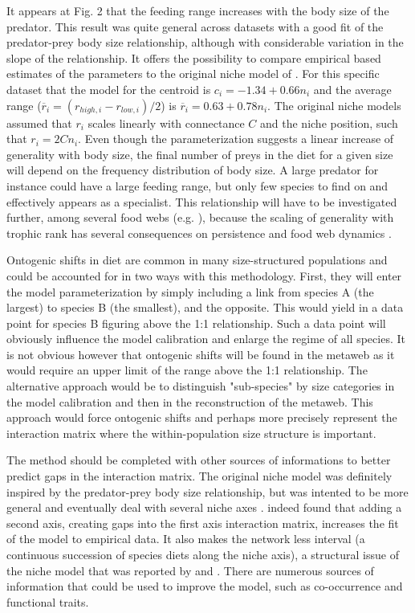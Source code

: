 \documentclass[12pt]{article}
\begin{document}
It appears at Fig. 2 that the feeding range increases with the body size of the
predator. This result was quite general across datasets with a good fit of the
predator-prey body size relationship, although with considerable variation in
the slope of the relationship. It offers the possibility to compare empirical
based estimates of the parameters to the original niche model of
\textcite{Williams2000}. For this specific dataset that the model for the
centroid is $c_i = -1.34 + 0.66n_i$ and the average range
($\overline{r}_i=(r_{high,i} - r_{low,i})/2$) is $\overline{r}_i = 0.63 +
0.78n_i$. The original niche models assumed that $r_i$ scales linearly with
connectance $C$ and the niche position, such that $r_i = 2Cn_i$. Even though the
parameterization suggests a linear increase of generality with body size, the
final number of preys in the diet for a given size will depend on the frequency
distribution of body size. A large predator for instance could have a large
feeding range, but only few species to find on and effectively appears as a
specialist. This relationship will have to be investigated further, among
several food webs (e.g. \textcite{Digel2011}), because the scaling of generality
with trophic rank has several consequences on persistence
\parencite{Gravel2011b} and food web dynamics \parencite{Brose2006,Berlow2009}.

Ontogenic shifts in diet are common in many size-structured populations and
could be accounted for in two ways with this methodology. First, they will enter
the model parameterization by simply including a link from species A (the
largest) to species B (the smallest), and the opposite. This would yield in a
data point for species B figuring above the 1:1 relationship. Such a data point
will obviously influence the model calibration and enlarge the regime of all
species. It is not obvious however that ontogenic shifts will be found in the
metaweb as it would require an upper limit of the range above the 1:1
relationship. The alternative approach would be to distinguish "sub-species" by
size categories in the model calibration and then in the reconstruction of the
metaweb. This approach would force ontogenic shifts and perhaps more precisely
represent the interaction matrix where the within-population size structure is
important.

The method should be completed with other sources of informations to better
predict gaps in the interaction matrix. The original niche model was definitely
inspired by the predator-prey body size relationship, but was intented to be
more general and eventually deal with several niche axes
\parencite{Williams2000}. \textcite{Allesina2008} indeed found that adding a
second axis, creating gaps into the first axis interaction matrix, increases the
fit of the model to empirical data. It also makes the network less interval (a
continuous succession of species diets along the niche axis), a structural issue
of the niche model that was reported by \textcite{Cattin2004} and
\textcite{Bersier2006}. There are numerous sources of information that could be
used to improve the model, such as co-occurrence and functional traits.
\end{document}
